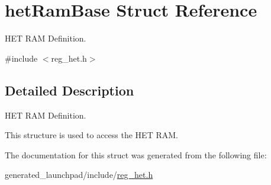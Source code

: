 \hypertarget{structhetRamBase}{}\section{het\+Ram\+Base Struct Reference}
\label{structhetRamBase}


H\+ET R\+AM Definition.  




{\ttfamily \#include $<$reg\+\_\+het.\+h$>$}



\subsection{Detailed Description}
H\+ET R\+AM Definition. 

This structure is used to access the H\+ET R\+AM. 

The documentation for this struct was generated from the following file\+:\begin{DoxyCompactItemize}
\item 
generated\+\_\+launchpad/include/\mbox{\hyperlink{reg__het_8h}{reg\+\_\+het.\+h}}\end{DoxyCompactItemize}
